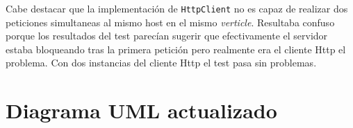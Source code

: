 Cabe destacar que la implementación de \texttt{HttpClient} no es capaz de realizar
dos peticiones simultaneas al mismo host en el mismo \emph{verticle}. Resultaba confuso 
porque los resultados del test parecían sugerir que efectivamente el servidor estaba 
bloqueando tras la primera petición pero realmente era el cliente Http el problema. 
Con dos instancias del cliente Http el test pasa sin problemas.


\section{Diagrama UML actualizado}
